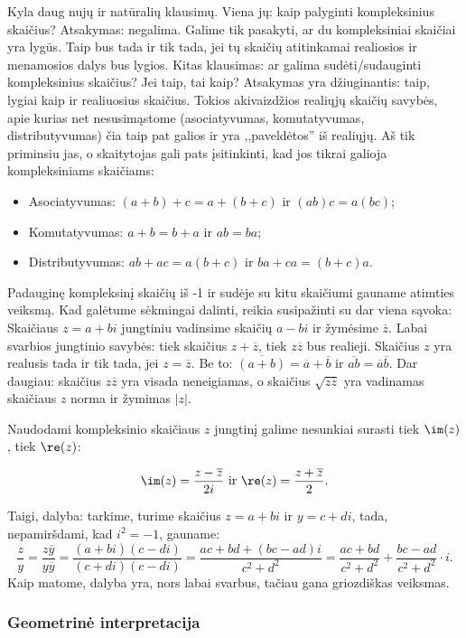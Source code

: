 Kyla daug nujų ir natūralių klausimų. Viena jų: kaip palyginti kompleksinius skaičius? Atsakymas: negalima. Galime tik pasakyti, ar du kompleksiniai skaičiai yra lygūs. Taip bus tada ir tik tada, jei tų skaičių atitinkamai realiosios ir menamosios dalys bus lygios. Kitas klausimas: ar galima sudėti/sudauginti kompleksinius skaičius? Jei taip, tai kaip? Atsakymas yra džiuginantis: taip, lygiai kaip ir realiuosius skaičius. Tokios akivaizdžios realiųjų skaičių savybės, apie kurias net nesusimąstome (asociatyvumas, komutatyvumas, distributyvumas) čia taip pat galios ir yra ,,paveldėtos'' iš realiųjų. Aš tik priminsiu jas, o skaitytojas gali pats įsitinkinti, kad jos tikrai galioja kompleksiniams skaičiams: 

\begin{itemize}
\item Asociatyvumas: $(a+b)+c=a+(b+c)$ ir $(ab)c=a(bc)$; 
\item Komutatyvumas: $a+b=b+a$ ir $ab=ba$;
\item Distributyvumas: $ab+ac=a(b+c)$ ir $ba+ca=(b+c)a$.
\end{itemize} 

Padauginę kompleksinį skaičių iš -1 ir sudėje su kitu skaičiumi gauname atimties veiksmą. Kad galėtume sėkmingai dalinti, reikia susipažinti su dar viena sąvoka: Skaičiaus $z=a+bi$ jungtiniu vadinsime skaičių $a-bi$ ir žymėsime $\overline{z}$. Labai svarbios jungtinio savybės: tiek skaičius $z+\overline{z}$, tiek $z\overline{z}$ bus realieji. Skaičius $z$ yra realusis tada ir tik tada, jei $z=\overline{z}$. Be to: $\overline{(a+b)}=\overline{a}+\overline{b}$ ir $\overline{ab}=\overline{a}\overline{b}$. Dar daugiau: skaičius $z\overline{z}$ yra visada neneigiamas, o skaičius $\sqrt{z\overline{z}}$ yra vadinamas skaičiaus $z$ norma ir žymimas $|z|$. 

Naudodami kompleksinio skaičiaus $z$ jungtinį galime nesunkiai surasti tiek $\im(z)$, tiek $\re(z)$:

$$\im(z)=\frac{z-\overline{z}}{2i}\text{ ir }\re(z)=\frac{z+\overline{z}}{2}.$$

Taigi, dalyba: tarkime, turime skaičius $z=a+bi$ ir $y=c+di$, tada, nepamiršdami, kad $i^2=-1$, gauname: $$\frac{z}{y}=\frac{z\overline{y}}{y\overline{y}}=\frac{(a+bi)(c-di)}{(c+di)(c-di)}=\frac{ac+bd+(bc-ad)i}{c^2+d^2}=\frac{ac+bd}{c^2+d^2}+\frac{bc-ad}{c^2+d^2}\cdot i.$$ Kaip matome, dalyba yra, nors labai svarbus, tačiau gana griozdiškas veiksmas.

\subsubsection{Geometrinė interpretacija}

